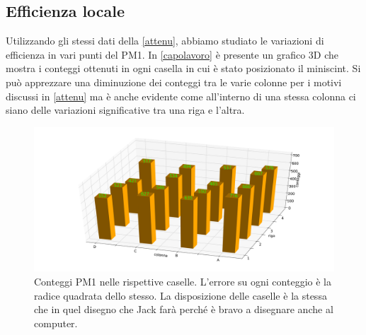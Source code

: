 \subsection{Efficienza locale}

Utilizzando gli stessi dati della \autoref{attenu}, abbiamo studiato le variazioni di efficienza in vari punti del PM1. In \autoref{capolavoro} è presente un grafico 3D che mostra i conteggi ottenuti in ogni casella in cui è stato posizionato il miniscint. Si può apprezzare una diminuzione dei conteggi tra le varie colonne per i motivi discussi in \autoref{attenu} ma è anche evidente come all'interno di una stessa colonna ci siano delle variazioni significative tra una riga e l'altra.
\begin{figure}[h]
\flushleft
\includegraphics[width=17 cm]{3d_rit}
\caption{Conteggi PM1 nelle rispettive caselle. L'errore su ogni conteggio è la radice quadrata dello stesso. La disposizione delle caselle è la stessa che in quel disegno che Jack farà perché è bravo a disegnare anche al computer.}
\label{capolavoro}
\end{figure}

